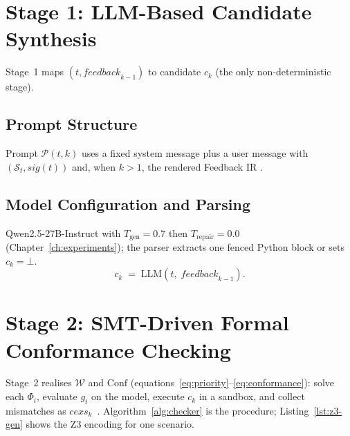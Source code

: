\section{Stage 1: LLM-Based Candidate Synthesis}
\label{sec:method:synthesis}

Stage~1 maps $(t, \mathit{feedback}_{k-1})$ to candidate $c_k$ (the only
non-deterministic stage).

\subsection{Prompt Structure}
\label{subsec:method:prompt}

Prompt $\mathcal{P}(t,k)$ uses a fixed system message plus a user message with
$(\mathcal{S}_t, \mathit{sig}(t))$ and, when $k>1$, the rendered Feedback IR
\citep{openai2023gpt4, chen2021codex}.

\subsection{Model Configuration and Parsing}
\label{subsec:method:model}

Qwen2.5-27B-Instruct with $T_\text{gen}=0.7$ then $T_\text{repair}=0.0$
(Chapter~\ref{ch:experiments}); the parser extracts one fenced Python block
or sets $c_k=\bot$.
\begin{equation}
  c_k \;=\; \mathrm{LLM}\!\left(t,\;\mathit{feedback}_{k-1}\right).
  \label{eq:synthesis}
\end{equation}

\section{Stage 2: SMT-Driven Formal Conformance Checking}
\label{sec:method:checker}

Stage~2 realises $\mathcal{W}$ and $\mathrm{Conf}$
(equations~\eqref{eq:priority}--\eqref{eq:conformance}):
solve each $\Phi_i$, evaluate $g_t$ on the model, execute $c_k$ in a sandbox,
and collect mismatches as $\mathit{cexs}_k$~\citep{demoura2008z3, barrett2018smt}.
Algorithm~\ref{alg:checker} is the procedure; Listing~\ref{lst:z3-gen} shows
the Z3 encoding for one scenario.


